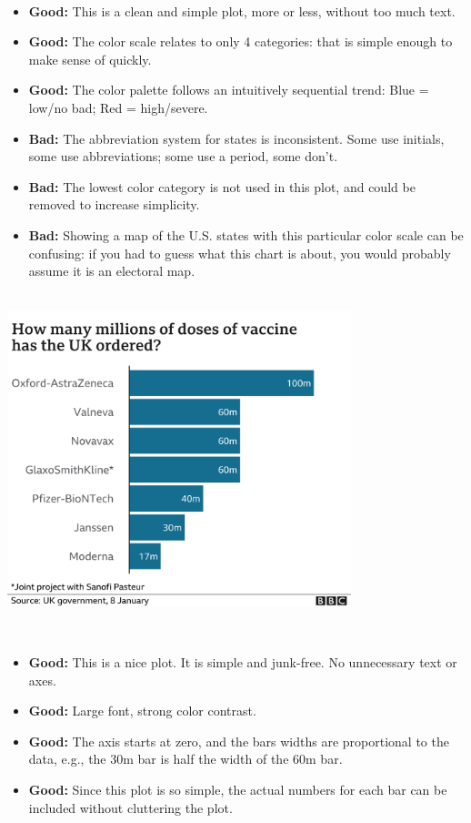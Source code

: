 \documentclass[
]{book}
\providecommand{\tightlist}{%
  \setlength{\itemsep}{0pt}\setlength{\parskip}{0pt}}
\begin{document}
~

\begin{itemize}
\tightlist
\item
  \textbf{Good:} This is a clean and simple plot, more or less, without too much text.
\item
  \textbf{Good:} The color scale relates to only 4 categories: that is simple enough to make sense of quickly.\\
\item
  \textbf{Good:} The color palette follows an intuitively sequential trend: Blue = low/no bad; Red = high/severe.
\item
  \textbf{Bad:} The abbreviation system for states is inconsistent. Some use initials, some use abbreviations; some use a period, some don't.\\
\item
  \textbf{Bad:} The lowest color category is not used in this plot, and could be removed to increase simplicity.\\
\item
  \textbf{Bad:} Showing a map of the U.S. states with this particular color scale can be confusing: if you had to guess what this chart is about, you would probably assume it is an electoral map.
\end{itemize}

~\\

\includegraphics[width=0.75\textwidth,height=\textheight]{img/visc.png}

~

\begin{itemize}
\tightlist
\item
  \textbf{Good:} This is a nice plot. It is simple and junk-free. No unnecessary text or axes.
\item
  \textbf{Good:} Large font, strong color contrast.\\
\item
  \textbf{Good:} The axis starts at zero, and the bars widths are proportional to the data, e.g., the 30m bar is half the width of the 60m bar.\\
\item
  \textbf{Good:} Since this plot is so simple, the actual numbers for each bar can be included without cluttering the plot.
\end{itemize}
\end{document}
